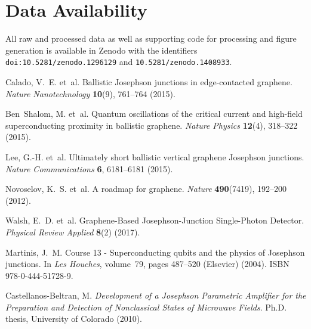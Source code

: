 \documentclass[preprint,
  onecolumn,
  notitlepage,
  amsmath,amssymb,
  aip,
  apl,
]{revtex4-1}
\begin{document}
\section*{Data Availability}
All raw and processed data as well as supporting code for processing and figure generation is available in Zenodo with the identifiers \verb|doi:10.5281/zenodo.1296129|\cite{zenodo1} and \verb|10.5281/zenodo.1408933|\cite{zenodo2}.

%
%

\begin{thebibliography}{10}
	
	Calado, V.~E. et~al.
	\newblock Ballistic {{Josephson}} junctions in edge-contacted graphene.
	\newblock \emph{Nature Nanotechnology} \textbf{10}(9), 761--764 (2015).
	
	Ben~Shalom, M. et~al.
	\newblock Quantum oscillations of the critical current and high-field
	superconducting proximity in ballistic graphene.
	\newblock \emph{Nature Physics} \textbf{12}(4), 318--322 (2015).
	
	Lee, G.-H. et~al.
	\newblock Ultimately short ballistic vertical graphene {{Josephson}} junctions.
	\newblock \emph{Nature Communications} \textbf{6}, 6181--6181 (2015).
	
	Novoselov, K.~S. et~al.
	\newblock A roadmap for graphene.
	\newblock \emph{Nature} \textbf{490}(7419), 192--200 (2012).
	
	Walsh, E.~D. et~al.
	\newblock Graphene-{{Based Josephson}}-{{Junction Single}}-{{Photon Detector}}.
	\newblock \emph{Physical Review Applied} \textbf{8}(2) (2017).
	
	Martinis, J.~M.
	\newblock Course 13 - {{Superconducting}} qubits and the physics of {{Josephson}}
	junctions.
	\newblock In \emph{Les {{Houches}}}, volume~79, pages 487--520 ({Elsevier})
	(2004).
	\newblock ISBN 978-0-444-51728-9.
	
	{Castellanos-Beltran}, M.
	\newblock \emph{Development of a {Josephson} {Parametric} {Amplifier} for the
		{Preparation} and {Detection} of {Nonclassical} {States} of {Microwave} {Fields}}.
	\newblock Ph.D. thesis, University of Colorado (2010).
	

\end{thebibliography}
\end{document}
